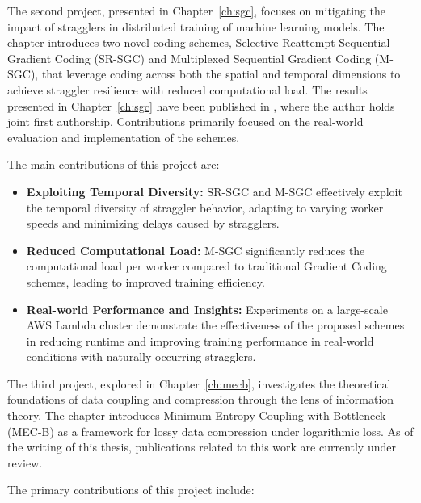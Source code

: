 The second project, presented in Chapter~\ref{ch:sgc}, focuses on mitigating the impact of stragglers in distributed training of machine learning models. The chapter introduces two novel coding schemes, Selective Reattempt Sequential Gradient Coding (SR-SGC) and Multiplexed Sequential Gradient Coding (M-SGC), that leverage coding across both the spatial and temporal dimensions to achieve straggler resilience with reduced computational load. The results presented in Chapter~\ref{ch:sgc} have been published in \cite{krishnan2023sequential}, where the author holds joint first authorship. Contributions primarily focused on the real-world evaluation and implementation of the schemes.

The main contributions of this project are:

\begin{itemize}
    \item \textbf{Exploiting Temporal Diversity:} SR-SGC and M-SGC effectively exploit the temporal diversity of straggler behavior, adapting to varying worker speeds and minimizing delays caused by stragglers.
    \item \textbf{Reduced Computational Load:} M-SGC significantly reduces the computational load per worker compared to traditional Gradient Coding schemes, leading to improved training efficiency.
    \item \textbf{Real-world Performance and Insights:} Experiments on a large-scale AWS Lambda cluster demonstrate the effectiveness of the proposed schemes in reducing runtime and improving training performance in real-world conditions with naturally occurring stragglers.
\end{itemize}

The third project, explored in Chapter~\ref{ch:mecb}, investigates the theoretical foundations of data coupling and compression through the lens of information theory. The chapter introduces Minimum Entropy Coupling with Bottleneck (MEC-B) as a framework for lossy data compression under logarithmic loss. As of the writing of this thesis, publications related to this work are currently under review.

The primary contributions of this project include: 

